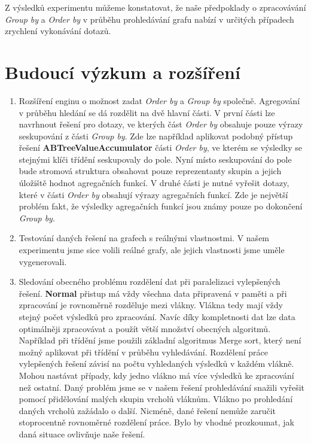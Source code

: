 Z výsledků experimentu můžeme konstatovat, že naše předpoklady o zpracovávání \textit{Group by} a \textit{Order by} v průběhu prohledávání grafu nabízí v určitých případech zrychlení vykonávání dotazů.

\section*{Budoucí výzkum a rozšíření}

\begin{enumerate}

\item 
Rozšíření enginu o možnost zadat \textit{Order by} a \textit{Group by} společně.
Agregování v průběhu hledání se dá rozdělit na dvě hlavní části.
V první části lze navrhnout řešení pro dotazy, ve kterých část \textit{Order by} obsahuje pouze výrazy seskupování z části \textit{Group by}.
Zde lze například aplikovat podobný přístup řešení \textbf{ABTreeValueAccumulator} části \textit{Order by}, ve kterém se výsledky se stejnými klíči třídění seskupovaly do pole.
Nyní místo seskupování do pole bude stromová struktura obsahovat pouze reprezentanty skupin a jejich úložiště hodnot agregačních funkcí.
V druhé části je nutné vyřešit dotazy, které v části \textit{Order by} obsahují výrazy agregačních funkcí.
Zde je největší problém fakt, že výsledky agregačních funkcí jsou známy pouze po dokončení \textit{Group by}.

\item Testování daných řešení na grafech s reálnými vlastnostmi.
V našem experimentu jsme sice volili reálné grafy, ale jejich vlastnosti jsme uměle vygenerovali.

\item Sledování obecného problému rozdělení dat při paralelizaci vylepšených řešení. 
\textbf{Normal} přistup má vždy všechna data připravená v paměti a při zpracování je rovnoměrně rozděluje mezi vlákny.
Vlákna tedy mají vždy stejný počet výsledků pro zpracování.
Navíc díky kompletnosti dat lze data optimálněji zpracovávat a použít větší množství obecných algoritmů.
Například při třídění jsme použili základní algoritmus Merge sort, který není možný aplikovat při třídění v průběhu vyhledávání.  
Rozdělení práce vylepšených řešení závisí na počtu vyhledaných výsledků v každém vlákně.
Mohou nastávat případy, kdy jedno vlákno má více výsledků ke zpracování než ostatní. 
Daný problém jsme se v našem řešení prohledávání snažili vyřešit pomocí přidělování malých skupin vrcholů vláknům.
Vlákno po prohledání daných vrcholů zažádalo o další.
Nicméně, dané řešení nemůže zaručit stoprocentně rovnoměrné rozdělení práce.
Bylo by vhodné prozkoumat, jak daná situace ovlivňuje naše řešení.


\end{enumerate}
